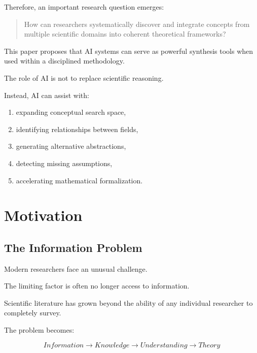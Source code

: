 \documentclass[11pt]{article}
\begin{document}
Therefore, an important research question emerges:


\begin{quote}

How can researchers systematically discover and integrate concepts from
multiple scientific domains into coherent theoretical frameworks?

\end{quote}



This paper proposes that AI systems can serve as powerful synthesis
tools when used within a disciplined methodology.

The role of AI is not to replace scientific reasoning.

Instead, AI can assist with:


\begin{enumerate}

\item expanding conceptual search space,

\item identifying relationships between fields,

\item generating alternative abstractions,

\item detecting missing assumptions,

\item accelerating mathematical formalization.

\end{enumerate}



\section{Motivation}


\subsection{The Information Problem}


Modern researchers face an unusual challenge.

The limiting factor is often no longer access to information.

Scientific literature has grown beyond the ability of any individual
researcher to completely survey.


The problem becomes:


\[
Information
\rightarrow
Knowledge
\rightarrow
Understanding
\rightarrow
Theory
\]
\end{document}
